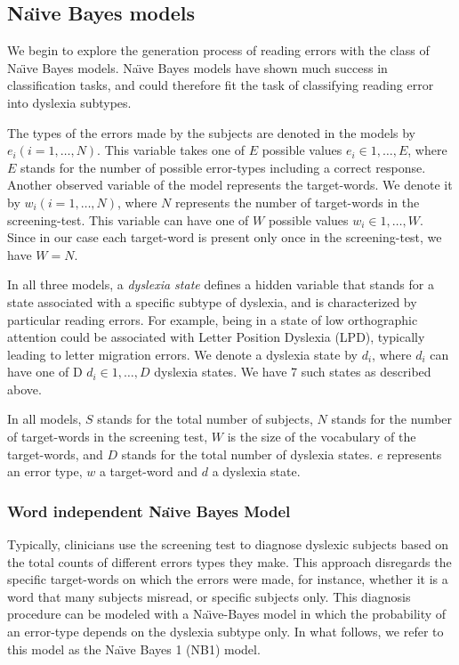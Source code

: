 \subsection{Na\"{\i}ve Bayes models}
We begin to explore the generation process of reading errors with the class of Na\"{\i}ve Bayes models. Na\"{\i}ve Bayes models have shown much success in classification tasks, and could therefore fit the task of classifying reading error into dyslexia subtypes. 

The types of the errors made by the subjects are denoted in the models by $ e_i (i = 1, \dots , N) $. This variable takes one of $E$ possible values $ e_i \in {1, \dots , E} $, where $E$ stands for the number of possible error-types including a correct response. Another observed variable of the model represents the target-words. We denote it by $ w_i (i = 1, \dots , N) $, where $N$ represents the number of target-words in the screening-test. This variable can have one of $W$ possible values $ w_i \in {1, \dots , W} $. Since in our case each target-word is present only once in the screening-test, we have $ W = N $.

In all three models, a {\it dyslexia state} defines a hidden variable that stands for a state associated with a specific subtype of dyslexia, and is characterized by particular reading errors. For example, being in a state of low orthographic attention could be associated with Letter Position Dyslexia (LPD), typically leading to letter migration errors. We denote a dyslexia state by $d_i$, where $d_i$ can have one of D $ d_i \in {1, \dots ,D} $ dyslexia states. We have 7 such states as described above.

In all models, $S$ stands for the total number of subjects, $N$ stands for the number of target-words in the screening test, $W$ is the size of the vocabulary of the target-words, and $D$ stands for the total number of dyslexia states. $e$ represents an error type, $w$ a target-word and $d$ a dyslexia state.

\subsubsection{Word independent Na\"{\i}ve Bayes Model}
Typically, clinicians use the screening test to diagnose dys\-lexic subjects based on the total counts of different errors types they make. This approach disregards the specific target-words on which the errors were made, for instance, whether it is a word that many subjects misread, or specific subjects only. This diagnosis procedure can be modeled with a Na\"{\i}ve-Bayes model in which the probability of an error-type depends on the dyslexia subtype only. In what follows, we refer to this model as the Na\"{\i}ve Bayes 1 (NB1) model.

